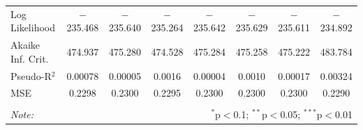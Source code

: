 \documentclass[12pt]{article}
\begin{document}
\begin{table}[!htbp]
\begin{adjustbox}{width=\textwidth}
\begin{tabular}{@{\extracolsep{5pt}}lccccccc}
Log Likelihood & $-$235.468 & $-$235.640 & $-$235.264 & $-$235.642 & $-$235.629 & $-$235.611 & $-$234.892 \\ 
Akaike Inf. Crit. & 474.937 & 475.280 & 474.528 & 475.284 & 475.258 & 475.222 & 483.784 \\ 
Pseudo-R$^{2}$ & 0.00078 & 0.00005 & 0.0016 & 0.00004 & 0.0010 & 0.00017 & 0.00324 \\
MSE & 0.2298 & 0.2300 & 0.2295 & 0.2300 & 0.2300 & 0.2300 & 0.2290 \\
\hline 
\hline \\[-1.8ex] 
\textit{Note:}  & \multicolumn{7}{r}{$^{*}$p$<$0.1; $^{**}$p$<$0.05; $^{***}$p$<$0.01} \\ 
\end{tabular}
\end{adjustbox} 
\end{table}  
\end{document}
